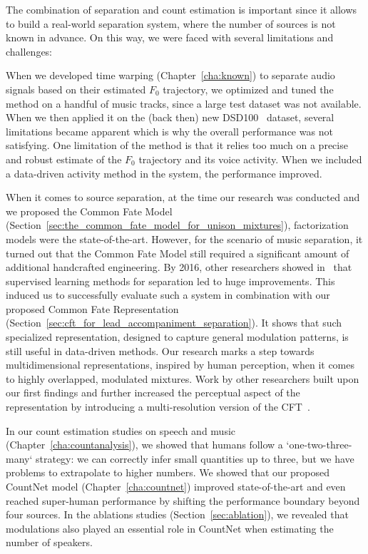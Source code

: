 The combination of separation and count estimation is important since it allows to build a real-world separation system, where the number of sources is not known in advance.
On this way, we were faced with several limitations and challenges:
\par
When we developed time warping (Chapter~\ref{cha:known}) to separate audio signals based on their estimated \(F_0\) trajectory, we optimized and tuned the method on a handful of music tracks, since a large test dataset was not available. When we then applied it on the (back then) new DSD100~\cite{liutkus17} dataset, several limitations became apparent which is why the overall performance was not satisfying. One limitation of the method is that it relies too much on a precise and robust estimate of the \(F_0\) trajectory and its voice activity. When we included a data-driven activity method in the system, the performance improved.
\par
When it comes to source separation, at the time our research was conducted and we proposed the Common Fate Model (Section~\ref{sec:the_common_fate_model_for_unison_mixtures}), factorization models were the state-of-the-art.
However, for the scenario of music separation, it turned out that the Common Fate Model still required a significant amount of additional handcrafted engineering.
By 2016, other researchers showed in~\cite{uhlich15, nugraha162} that supervised learning methods for separation led to huge improvements. This induced us to successfully evaluate such a system in combination with our proposed Common Fate Representation (Section~\ref{sec:cft_for_lead_accompaniment_separation}).
It shows that such specialized representation, designed to capture general modulation patterns, is still useful in data-driven methods.
Our research marks a step towards multidimensional representations, inspired by human perception, when it comes to highly overlapped, modulated mixtures. Work by other researchers built upon our first findings and further increased the perceptual aspect of the representation by introducing a multi-resolution version of the CFT~\cite{seetharaman17, pishdadian18}.
\par
In our count estimation studies on speech and music (Chapter~\ref{cha:countanalysis}), we showed that humans follow a `one-two-three-many` strategy: we can correctly infer small quantities up to three, but we have problems to extrapolate to higher numbers.
We showed that our proposed CountNet model (Chapter~\ref{cha:countnet}) improved state-of-the-art and even reached super-human performance by shifting the performance boundary beyond four sources. In the ablations studies (Section~\ref{sec:ablation}), we revealed that modulations also played an essential role in CountNet when estimating the number of speakers.
